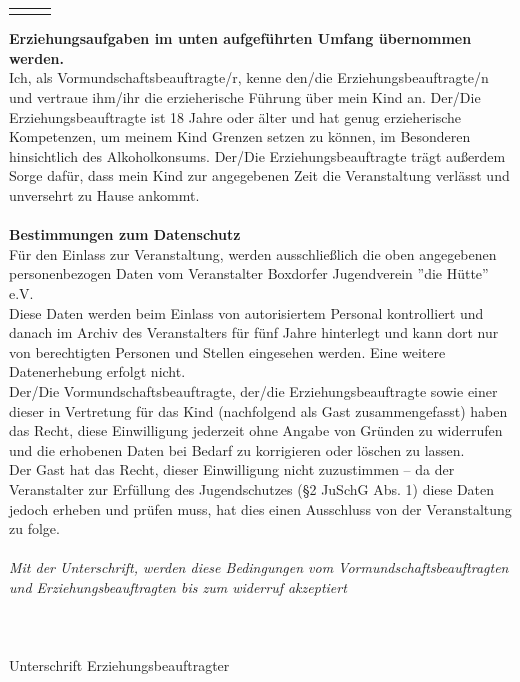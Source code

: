 \documentclass[10pt,a4paper,ngerman]{article}
\begin{document}
\begin{Form}
\begin{tabularx}{\linewidth}{m{0.333\linewidth}m{0.333\linewidth}m{0.333\linewidth}}
		& & \\
	\end{tabularx}
	{\bfseries \large Erziehungsaufgaben im unten aufgeführten Umfang übernommen werden.} \\
	Ich, als Vormundschaftsbeauftragte/r, kenne den/die Erziehungsbeauftragte/n und vertraue ihm/ihr die erzieherische Führung über mein Kind an. Der/Die Erziehungsbeauftragte ist 18 Jahre oder älter und hat genug erzieherische Kompetenzen, um meinem Kind Grenzen setzen zu können, im Besonderen hinsichtlich des Alkoholkonsums. Der/Die Erziehungsbeauftragte trägt außerdem Sorge dafür, dass mein Kind zur angegebenen Zeit die Veranstaltung verlässt und unversehrt zu Hause ankommt. \\
	\\
	{\bfseries \large Bestimmungen zum Datenschutz} \\
	Für den Einlass zur Veranstaltung, werden ausschließlich die oben angegebenen personenbezogen Daten vom Veranstalter Boxdorfer Jugendverein ''die Hütte'' e.V. \\
	Diese Daten werden beim Einlass von autorisiertem Personal kontrolliert und danach im Archiv des Veranstalters für fünf Jahre hinterlegt und kann dort nur von berechtigten Personen und Stellen eingesehen werden. Eine weitere Datenerhebung erfolgt nicht. \\
	Der/Die Vormundschaftsbeauftragte, der/die Erziehungsbeauftragte sowie einer dieser in Vertretung für das Kind (nachfolgend als Gast zusammengefasst) haben das Recht, diese Einwilligung jederzeit ohne Angabe von Gründen zu widerrufen und die erhobenen Daten bei Bedarf zu korrigieren oder löschen zu lassen.\\
	Der Gast hat das Recht, dieser Einwilligung nicht zuzustimmen – da der Veranstalter zur Erfüllung des Jugendschutzes (§2 JuSchG Abs. 1) diese Daten jedoch erheben und prüfen muss, hat dies einen Ausschluss von der Veranstaltung zu folge.
	\\
	\\
	{\em Mit der Unterschrift, werden diese Bedingungen vom Vormundschaftsbeauftragten und Erziehungsbeauftragten bis zum widerruf akzeptiert}
	\\
	\\
	\vspace{20pt}\\
	\makebox[0.666\linewidth]{{\LARGE\faPencil}\dotfill} \\
	Unterschrift Erziehungsbeauftragter
	\\
	\\

\end{Form}
\end{document}
